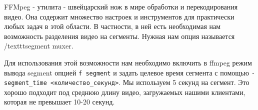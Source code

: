 FFMpeg - утилита - швейцарский нож в мире обработки и перекодирования видео. Она содержит множество настроек и инструментов для практически любых задач в этой области. В частности, в ней есть необходимая нам возможность разделения видео на сегменты. Нужная нам опция называется /texttt{segment muxer}.

Для использования этой возможности нам необходимо включить в ffmpeg режим вывода segment опцией \texttt{\-f segment} и задать целевое время сегмента с помощью \texttt{-segment\_time <количество\_секунд>}. Мы используем 5 секунд на сегмент. Это хорошо подходит под среднюю длину видео, загружаемых нашими клиентами, которая не превышает 10-20 секунд.
